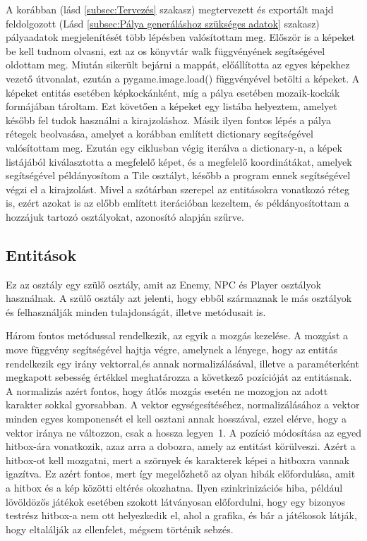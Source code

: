  A korábban (lásd \ref{subsec:Tervezés} szakasz) megtervezett és exportált majd feldolgozott (Lásd \ref{subsec:Pálya generáláshoz szükséges adatok} szakasz) pályaadatok megjelenítését több lépésben valósítottam meg. Először is a képeket be kell tudnom olvasni, ezt az os \cite{Python-os} könyvtár walk függvényének segítségével oldottam meg.
 Miután sikerült bejárni a mappát, előállította az egyes képekhez vezető útvonalat, ezután a pygame.image.load() függvényével betölti a képeket. A képeket entitás esetében képkockánként, míg a pálya esetében mozaik-kockák formájában tároltam.
  Ezt követően a képeket egy listába helyeztem, amelyet később fel tudok használni a kirajzoláshoz.
   Másik ilyen fontos lépés a pálya rétegek beolvasása, amelyet a korábban említett dictionary segítségével valósítottam meg.
    Ezután egy ciklusban végig iterálva a dictionary-n, a képek listájából kiválasztotta a megfelelő képet, és a megfelelő koordinátákat,
     amelyek segítségével példányosítom a Tile osztályt, később a program ennek segítségével végzi el a kirajzolást.
      Mivel a szótárban szerepel az entitásokra vonatkozó réteg is, ezért azokat is az előbb említett iterációban kezeltem,
       és példányosítottam a hozzájuk tartozó osztályokat, azonosító alapján szűrve.

\subsection{Entitások} \label{subsec:Entitások}
 Ez az osztály egy szülő osztály, amit az Enemy, NPC és Player osztályok használnak. A szülő osztály azt jelenti, hogy ebből származnak le más osztályok és felhasználják minden tulajdonságát, illetve metódusait is.  

Három fontos metódussal rendelkezik, az egyik a mozgás kezelése. A mozgást a move függvény segítségével hajtja végre, amelynek a lényege, hogy az entitás rendelkezik egy irány vektorral,és annak normalizálásával, illetve a paraméterként megkapott sebesség értékkel meghatározza a következő pozícióját az entitásnak. A normalizás azért fontos, hogy átlós mozgás esetén ne mozogjon az adott karakter sokkal gyorsabban. A vektor egységesítéséhez, normalizálásához a vektor minden egyes komponensét el kell osztani annak hosszával, ezzel elérve, hogy a vektor iránya ne változzon, csak a hossza legyen~1. A pozíció módosítása az egyed hitbox-ára vonatkozik, azaz arra a dobozra, amely az entitást körülveszi. Azért a hitbox-ot kell mozgatni, mert a szörnyek és karakterek képei a hitboxra vannak igazítva. Ez azért fontos, mert így megelőzhető az olyan hibák előfordulása, amit a hitbox és a kép közötti eltérés okozhatna. Ilyen szinkrinizációs hiba, például lövöldözős játékok esetében szokott látványosan előfordulni, hogy egy bizonyos testrész hitbox-a nem ott helyezkedik el, ahol a grafika, és bár a játékosok látják, hogy eltalálják az ellenfelet, mégsem történik sebzés.

